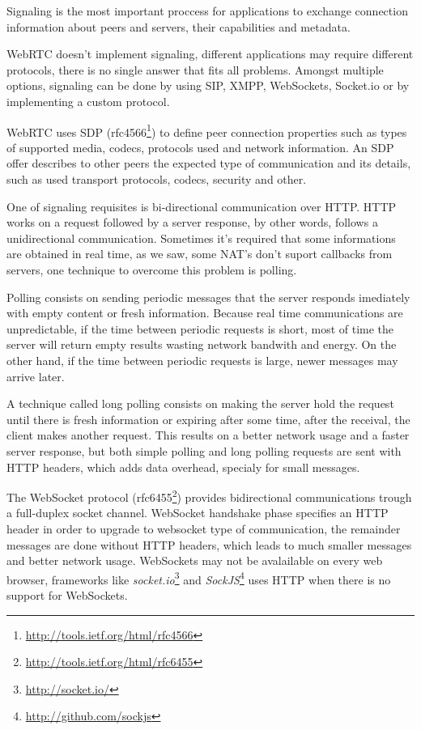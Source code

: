 Signaling is the most important proccess for applications to exchange connection information about peers and servers, their capabilities and metadata.

  \ac{WebRTC} doesn't implement signaling, different applications may require different protocols, there is no single answer that fits all problems. Amongst multiple options, signaling can be done by using \ac{SIP}, \ac{XMPP}, WebSockets, Socket.io or by implementing a custom protocol.

  \ac{WebRTC} uses \ac{SDP} (rfc4566\footnote{\url{http://tools.ietf.org/html/rfc4566}}) to define peer connection properties such as types of supported media, codecs, protocols used and network information. An \ac{SDP} offer describes to other peers the expected type of communication and its details, such as used transport protocols, codecs, security and other.

  One of signaling requisites is bi-directional communication over \ac{HTTP}. \ac{HTTP} works on a request followed by a server response, by other words, follows a unidirectional communication. Sometimes it's required that some informations are obtained in real time, as we saw, some \ac{NAT}'s don't suport callbacks from servers, one technique to overcome this problem is polling.

  Polling consists on sending periodic messages that the server responds imediately with empty content or fresh information. Because real time communications are unpredictable, if the time between periodic requests is short, most of time the server will return empty results wasting network bandwith and energy. On the other hand, if the time between periodic requests is large, newer messages may arrive later.

  A technique called long polling consists on making the server hold the request until there is fresh information or expiring after some time, after the receival, the client makes another request. This results on a better network usage and a faster server response, but both simple polling and long polling requests are sent with \ac{HTTP} headers, which adds data overhead, specialy for small messages.

  The WebSocket protocol (rfc6455\footnote{\url{http://tools.ietf.org/html/rfc6455}}) provides bidirectional communications trough a full-duplex socket channel. WebSocket handshake phase specifies an \ac{HTTP} header in order to upgrade to websocket type of communication, the remainder messages are done without \ac{HTTP} headers, which leads to much smaller messages and better network usage. WebSockets may not be avalailable on every web browser, frameworks like \textit{socket.io}\footnote{\url{http://socket.io/}} and \textit{SockJS}\footnote{\url{http://github.com/sockjs}} uses \ac{HTTP} when there is no support for WebSockets. 

